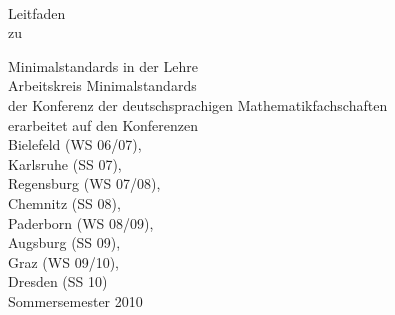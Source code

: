 \frontmatter
{}
\newpage
\thispagestyle{empty}~
\newpage

\begin{titlepage}
\begin{flushright}\sffamily
	\vspace*{1cm}
	{\Huge{Leitfaden}}\\
	\vspace{2.0cm}
	{\large zu}\bigskip\par
	{\huge{Minimalstandards in der Lehre}} \\
	\vspace{2ex}
	\vfill
	{\large{Arbeitskreis Minimalstandards}\smallskip \\ 
	{\large{der Konferenz der deutschsprachigen Mathematikfachschaften}}\\
	\vspace{1cm}
	erarbeitet auf den Konferenzen}\smallskip\\	
	{\small
	Bielefeld (WS 06/07), \\
	Karlsruhe (SS 07),  \\
	Regensburg (WS 07/08), \\
	Chemnitz (SS 08), \\
	Paderborn (WS 08/09),\\
	Augsburg (SS 09), \\
	Graz (WS 09/10), \\
	Dresden (SS 10)
	}\\
	\vspace{3cm}
	{\Large Sommersemester 2010}\\
	\vspace{14ex}
\end{flushright}
\end{titlepage}